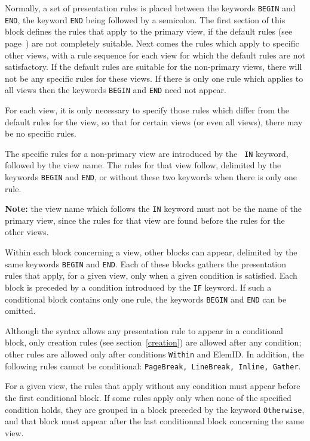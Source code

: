 Normally, a set of presentation rules is placed between the keywords
{\tt BEGIN} and {\tt END}, the keyword {\tt END} being followed by a
semicolon.  The first section of this block defines the rules that
apply to the primary view, if the default rules (see
page~\pageref{reglesdefaut}) are not completely suitable.  Next comes
the rules which apply to specific other views, with a rule sequence
for each view for which the default rules are not satisfactory.  If
the default rules are suitable for the non-primary views, there will
not be any specific rules for these views.  If there is only one rule
which applies to all views then the keywords {\tt BEGIN} and {\tt END}
need not appear.

For each view, it is only necessary to specify those rules which
differ from the default rules for the view, so that for certain views
(or even all views), there may be no specific rules.

\label{instrin}
The specific rules for a non-primary view are introduced by the {\tt
IN} keyword, followed by the view name.  The rules for that view
follow, delimited by the keywords {\tt BEGIN} and {\tt END}, or
without these two keywords when there is only one rule.

{\bf Note:} the view name which follows the {\tt IN} keyword must not
be the name of the primary view, since the rules for that view are
found before the rules for the other views.

Within each block concerning a view, other blocks can appear, delimited
by the same keywords {\tt BEGIN} and {\tt END}.  Each of these blocks
gathers the presentation rules that apply, for a given view, only when
a given condition is satisfied.  Each block is preceded by a condition
introduced by the {\tt IF} keyword.  If such a conditional block
contains only one rule, the keywords {\tt BEGIN} and {\tt END} can
be omitted.

Although the syntax allows any presentation rule to appear in
a conditional block, only creation rules (see section~\ref{creation})
are allowed after any condition; other rules are allowed only after
conditions {\tt Within} and ElemID.  In addition, the following
rules cannot
be conditional: {\tt PageBreak, LineBreak, Inline, Gather}.

For a given view, the rules that apply without any condition must
appear before the first conditional block.  If some rules apply only
when none of the specified condition holds, they are grouped in a
block preceded by the keyword {\tt Otherwise}, and that block must
appear after the last conditionnal block concerning the same view.

